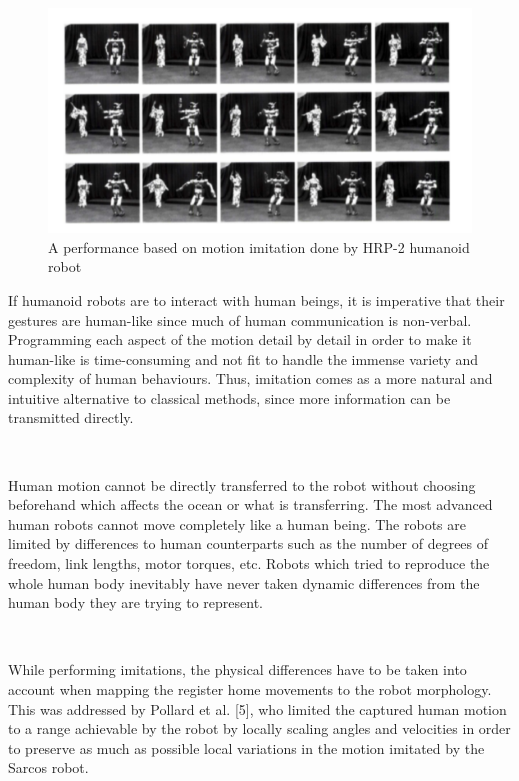 ~


\begin{figure}[h!]
\centering
\includegraphics[scale=0.9]{images/motion-imitation.png}\hfill
\caption[A motion imitation performance by HRP-2 humanoid robot]{A performance  based on motion imitation done by 
HRP-2 humanoid robot}\hfill
\label{marker-based-system}
\end{figure}


If humanoid robots are to interact with human beings, it is imperative that their gestures are human-like since much of
human communication is non-verbal. Programming each aspect of the motion detail by detail in order to make it human-like
is time-consuming and not fit to handle the immense variety and complexity of human behaviours. Thus, imitation comes
as a more natural and intuitive alternative to classical methods, since more information can be transmitted directly.

~

Human motion cannot be directly transferred to the robot without choosing beforehand which affects the ocean or what
is transferring. The most advanced human robots cannot move completely like a human being. The robots are limited 
by differences to human counterparts such as the number of degrees of freedom, link lengths, motor torques, etc. 
Robots which tried to reproduce the whole human body inevitably have never taken dynamic differences from the human 
body they are trying to represent.

~

While performing imitations, the physical differences have to be taken into account when mapping the register home 
movements to the robot morphology. This was addressed by Pollard et al. [5], who limited the captured human motion 
to a range achievable by the robot by locally scaling angles and velocities in order to preserve as much as possible 
local variations in the motion imitated by the Sarcos robot.


